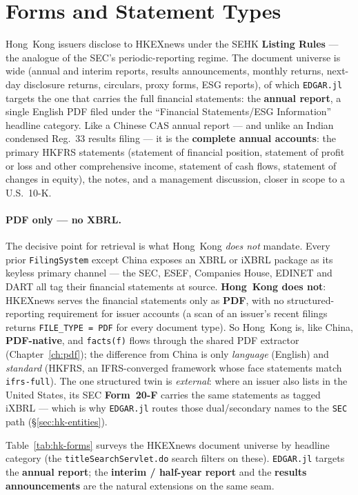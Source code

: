 \documentclass[11pt,a4paper]{report}
\begin{document}
\section{Forms and Statement Types}\label{sec:hk-forms}

Hong~Kong issuers disclose to HKEXnews under the SEHK \textbf{Listing Rules} --- the analogue of the SEC's
periodic-reporting regime. The document universe is wide (annual and interim reports, results announcements,
monthly returns, next-day disclosure returns, circulars, proxy forms, ESG reports), of which \texttt{EDGAR.jl}
targets the one that carries the full financial statements: the \textbf{annual report}, a single English PDF
filed under the ``Financial Statements/ESG Information'' headline category. Like a Chinese CAS annual report
--- and unlike an Indian condensed Reg.~33 results filing --- it is the \textbf{complete annual accounts}: the
primary HKFRS statements (statement of financial position, statement of profit or loss and other
comprehensive income, statement of cash flows, statement of changes in equity), the notes, and a management
discussion, closer in scope to a U.S.\ 10-K.

\paragraph{PDF only --- no XBRL.} The decisive point for retrieval is what Hong~Kong \emph{does not} mandate.
Every prior \texttt{FilingSystem} except China exposes an XBRL or iXBRL package as its keyless primary channel
--- the SEC, ESEF, Companies House, EDINET and DART all tag their financial statements at source.
\textbf{Hong~Kong does not}: HKEXnews serves the financial statements only as \textbf{PDF}, with no
structured-reporting requirement for issuer accounts (a scan of an issuer's recent filings returns
\texttt{FILE\_TYPE = PDF} for every document type). So Hong~Kong is, like China, \textbf{PDF-native}, and
\texttt{facts(f)} flows through the shared PDF extractor (Chapter~\ref{ch:pdf}); the difference from China is
only \emph{language} (English) and \emph{standard} (HKFRS, an IFRS-converged framework whose face statements
match \texttt{ifrs-full}). The one structured twin is \emph{external}: where an issuer also lists in the
United States, its SEC \textbf{Form~20-F} carries the same statements as tagged iXBRL --- which is why
\texttt{EDGAR.jl} routes those dual/secondary names to the \texttt{SEC} path (\S\ref{sec:hk-entities}).

Table~\ref{tab:hk-forms} surveys the HKEXnews document universe by headline category (the
\texttt{titleSearchServlet.do} search filters on these). \texttt{EDGAR.jl} targets the \textbf{annual report};
the \textbf{interim / half-year report} and the \textbf{results announcements} are the natural extensions on
the same seam.
\end{document}
